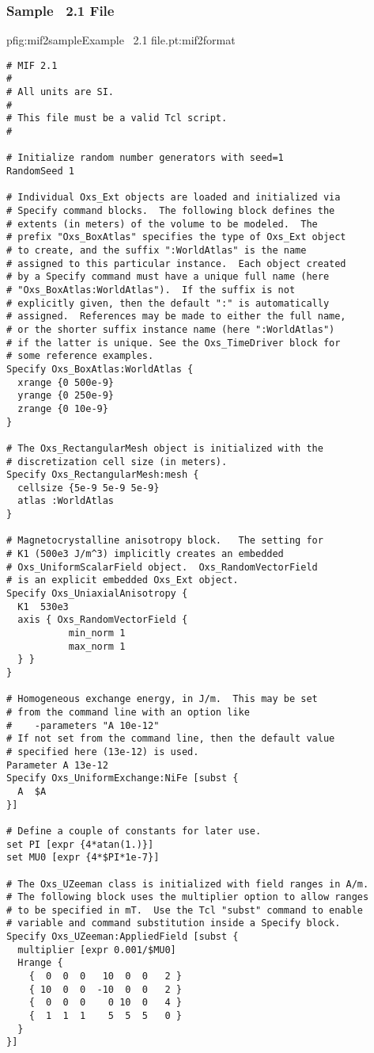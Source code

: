 \subsubsection{Sample \MIF~2.1 File}\label{sec:mif2sample}
\begin{codelisting}{p}{fig:mif2sample}{Example \MIF~2.1 file.}{pt:mif2format}
\begin{verbatim}
# MIF 2.1
#
# All units are SI.
#
# This file must be a valid Tcl script.
#

# Initialize random number generators with seed=1
RandomSeed 1

# Individual Oxs_Ext objects are loaded and initialized via
# Specify command blocks.  The following block defines the
# extents (in meters) of the volume to be modeled.  The
# prefix "Oxs_BoxAtlas" specifies the type of Oxs_Ext object
# to create, and the suffix ":WorldAtlas" is the name
# assigned to this particular instance.  Each object created
# by a Specify command must have a unique full name (here
# "Oxs_BoxAtlas:WorldAtlas").  If the suffix is not
# explicitly given, then the default ":" is automatically
# assigned.  References may be made to either the full name,
# or the shorter suffix instance name (here ":WorldAtlas")
# if the latter is unique. See the Oxs_TimeDriver block for
# some reference examples.
Specify Oxs_BoxAtlas:WorldAtlas {
  xrange {0 500e-9}
  yrange {0 250e-9}
  zrange {0 10e-9}
}

# The Oxs_RectangularMesh object is initialized with the
# discretization cell size (in meters).
Specify Oxs_RectangularMesh:mesh {
  cellsize {5e-9 5e-9 5e-9}
  atlas :WorldAtlas
}

# Magnetocrystalline anisotropy block.   The setting for
# K1 (500e3 J/m^3) implicitly creates an embedded
# Oxs_UniformScalarField object.  Oxs_RandomVectorField
# is an explicit embedded Oxs_Ext object.
Specify Oxs_UniaxialAnisotropy {
  K1  530e3
  axis { Oxs_RandomVectorField {
           min_norm 1
           max_norm 1
  } }
}

# Homogeneous exchange energy, in J/m.  This may be set
# from the command line with an option like
#    -parameters "A 10e-12"
# If not set from the command line, then the default value
# specified here (13e-12) is used.
Parameter A 13e-12
Specify Oxs_UniformExchange:NiFe [subst {
  A  $A
}]

# Define a couple of constants for later use.
set PI [expr {4*atan(1.)}]
set MU0 [expr {4*$PI*1e-7}]

# The Oxs_UZeeman class is initialized with field ranges in A/m.
# The following block uses the multiplier option to allow ranges
# to be specified in mT.  Use the Tcl "subst" command to enable
# variable and command substitution inside a Specify block.
Specify Oxs_UZeeman:AppliedField [subst {
  multiplier [expr 0.001/$MU0]
  Hrange {
    {  0  0  0   10  0  0   2 }
    { 10  0  0  -10  0  0   2 }
    {  0  0  0    0 10  0   4 }
    {  1  1  1    5  5  5   0 }
  }
}]


\end{verbatim}
\end{codelisting}
